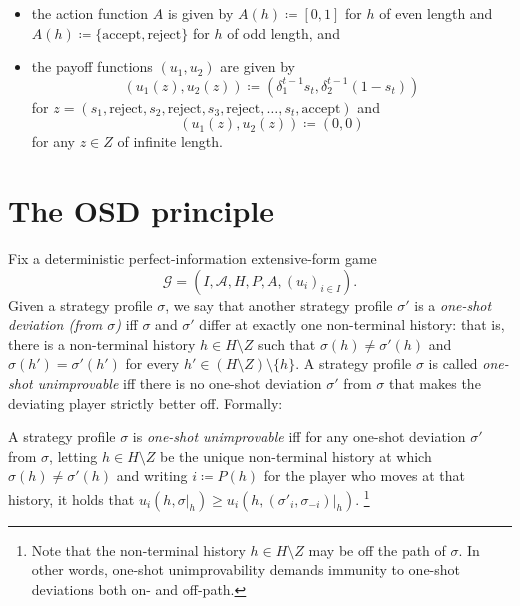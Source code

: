 \begin{example}
\begin{itemize}
		\item the action function $A$ is given by $A(h) \coloneqq [0,1]$ for $h$ of even length and $A(h) \coloneqq \{ \text{accept}, \text{reject} \}$ for $h$ of odd length, and

		\item the payoff functions $(u_1,u_2)$ are given by
		\begin{equation*}
			(u_1(z),u_2(z)) \coloneqq \left( \delta_1^{t-1} s_t, \delta_2^{t-1} (1-s_t) \right)
		\end{equation*}
		for $z = (s_1,\text{reject},s_2,\text{reject},s_3,\text{reject},\dots,s_t,\text{accept})$ and
		\begin{equation*}
			(u_1(z),u_2(z)) \coloneqq (0,0)
		\end{equation*}
		for any $z \in Z$ of infinite length.
	
	\end{itemize}
\end{example}



\section{The OSD principle}
\label{osdp:principle}

Fix a deterministic perfect-information extensive-form game
%
\begin{equation*}
	\mathcal{G}
	= (I,\mathcal{A},H,P,A,(u_i)_{i \in I}) .
\end{equation*}
%
Given a strategy profile $\sigma$, we say that another strategy profile $\sigma'$ is a \emph{one-shot deviation (from $\sigma$)} iff $\sigma$ and $\sigma'$ differ at exactly one non-terminal history: that is, there is a non-terminal history $h \in H \setminus Z$ such that $\sigma(h) \neq \sigma'(h)$ and $\sigma(h') = \sigma'(h')$ for every $h' \in (H \setminus Z) \setminus \{h\}$. A strategy profile $\sigma$ is called \emph{one-shot unimprovable} iff there is no one-shot deviation $\sigma'$ from $\sigma$ that makes the deviating player strictly better off. Formally:

\begin{definition}
	\label{definition:oneshot_unimp}
	A strategy profile $\sigma$ is \emph{one-shot unimprovable} iff for any one-shot deviation $\sigma'$ from $\sigma$, letting $h \in H \setminus Z$ be the unique non-terminal history at which $\sigma(h) \neq \sigma'(h)$ and writing $i \coloneqq P(h)$ for the player who moves at that history, it holds that $u_i(h,\sigma|_h) \geq u_i(h,(\sigma'_i,\sigma_{-i})|_h)$.%
	\footnote{Note that the non-terminal history $h \in H \setminus Z$ may be off the path of $\sigma$. In other words, one-shot unimprovability demands immunity to one-shot deviations both on- and off-path.}
\end{definition}

